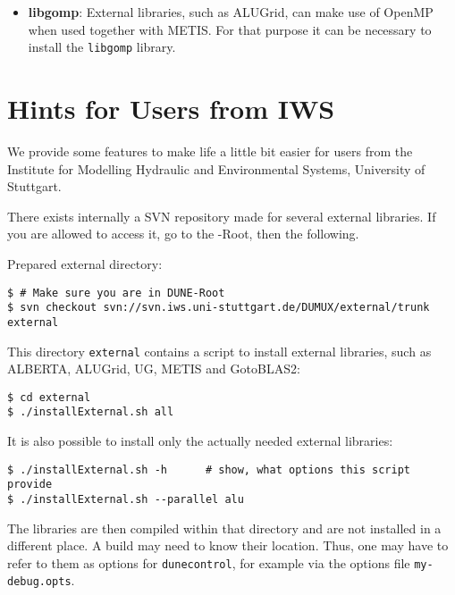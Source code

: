 \begin{itemize}
\item \textbf{libgomp}: External libraries, such as ALUGrid, can make use of OpenMP when used together with METIS. For that purpose it can be necessary to install the \texttt{libgomp} library.

\end{itemize}

\section{Hints for Users from IWS}
We provide some features to make life a little bit easier for
users from the Institute for Modelling Hydraulic and Environmental Systems, University of Stuttgart.

There exists internally a SVN repository made for several external libraries.
If you are allowed to access it, go to the {\Dune}-Root, then the following.

Prepared external directory:
\begin{lstlisting}[style=Bash]
$ # Make sure you are in DUNE-Root
$ svn checkout svn://svn.iws.uni-stuttgart.de/DUMUX/external/trunk external
\end{lstlisting}

This directory \texttt{external} contains a script to install external libraries, such as 
ALBERTA, ALUGrid, UG, METIS and GotoBLAS2:
\begin{lstlisting}[style=Bash]
$ cd external
$ ./installExternal.sh all
\end{lstlisting}

It is also possible to install only the actually needed external libraries:
\begin{lstlisting}[style=Bash]
$ ./installExternal.sh -h      # show, what options this script provide
$ ./installExternal.sh --parallel alu
\end{lstlisting}

The libraries are then compiled within that directory and are not installed in a different place. 
A \Dune build may need to know their location. Thus, one may have to refer to them as options for \texttt{dunecontrol}, 
for example via the options file \texttt{my-debug.opts}.

